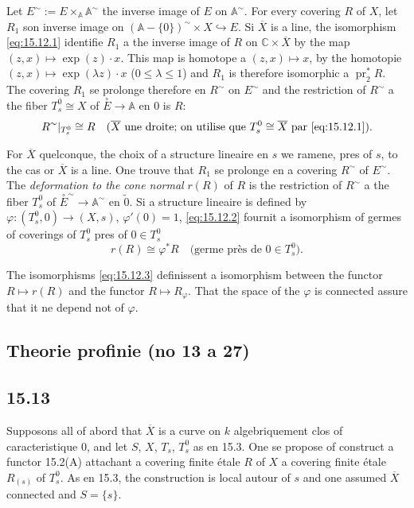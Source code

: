 \documentclass[12pt,a4paper]{article}
\theoremstyle{plain}
\theoremstyle{definition}
\theoremstyle{remark}
\DeclareMathOperator{\pr}{pr}
\newcommand{\bC}{\mathbb{C}}
\newcommand{\bA}{\mathbb{A}}
\begin{document}
Let $E^\sim := E \times_{\bA} \bA^\sim$ the inverse image of $E$ on $\bA^\sim$. For every covering $R$ of $X$, let $R_1$ son inverse image on $(\bA - \{0\})^\sim \times X \hookrightarrow E$. Si $\overline{X}$ is a line, the isomorphism \eqref{eq:15.12.1} identifie $R_1$ a the inverse image of $R$ on $\bC \times \overline{X}$ by the map $(z, x) \mapsto \exp(z) \cdot x$. This map is homotope a $(z, x) \mapsto x$, by the homotopie $(z, x) \mapsto \exp(\lambda z) \cdot x$ ($0 \leqslant \lambda \leqslant 1$) and $R_1$ is therefore isomorphic a $\pr_2^* R$. The covering $R_1$ se prolonge therefore en $R^\sim$ on $E^\sim$ and the restriction of $R^\sim$ a the fiber $T_s^0 \cong X$ of $\overset{\circ}{E} \to \bA$ en $0$ is $R$:
\begin{equation}\label{eq:15.12.2}
R^\sim|_{T_s^0} \cong R \quad (\overline{X} \text{ une droite; on utilise que } T_s^0 \cong \overline{X} \text{ par } \eqref{eq:15.12.1}).
\end{equation}

For $\overline{X}$ quelconque, the choix of a structure lineaire en $s$ we ramene, pres of $s$, to the cas or $\overline{X}$ is a line. One trouve that $R_1$ se prolonge en a covering $R^\sim$ of $E^\sim$. The \emph{deformation to the cone normal} $r(R)$ of $R$ is the restriction of $R^\sim$ a the fiber $T_s^0$ of $\overset{\circ}{E}^\sim \to \bA^\sim$ en $\tilde{0}$. Si a structure lineaire is defined by $\varphi : (T_s^0, 0) \to (X, s)$, $\varphi'(0) = 1$, \eqref{eq:15.12.2} fournit a isomorphism of germes of coverings of $T_s^0$ pres of $0 \in T_s^0$
\begin{equation}\label{eq:15.12.3}
r(R) \cong \varphi^* R \quad \text{(germe près de } 0 \in T_s^0\text{)}.
\end{equation}

The isomorphisms \eqref{eq:15.12.3} definissent a isomorphism between the functor $R \mapsto r(R)$ and the functor $R \mapsto R_\varphi$. That the space of the $\varphi$ is connected assure that it ne depend not of $\varphi$.


\subsection*{Theorie profinie (no 13 a 27)}

\subsection*{15.13}

Supposons all of abord that $\overline{X}$ is a curve on $k$ algebriquement clos of caracteristique $0$, and let $S$, $X$, $T_s$, $T_s^0$ as en 15.3. One se propose of construct a functor 15.2(A) attachant a covering finite étale $R$ of $X$ a covering finite étale $R_{(s)}$ of $T_s^0$. As en 15.3, the construction is local autour of $s$ and one assumed $\overline{X}$ connected and $S = \{s\}$.
\end{document}
